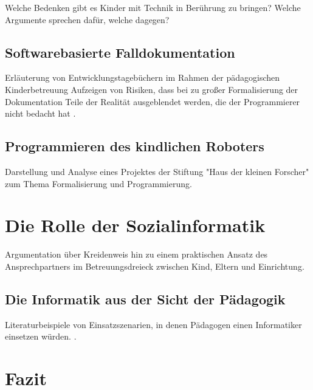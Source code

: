 Welche Bedenken gibt es Kinder mit Technik in Berührung zu bringen? Welche Argumente sprechen dafür, welche 
dagegen?

\section{Softwarebasierte Falldokumentation}

Erläuterung von Entwicklungstagebüchern im Rahmen der pädagogischen Kinderbetreuung 
Aufzeigen von Risiken, dass bei zu großer Formalisierung der Dokumentation Teile der Realität ausgeblendet werden, die der Programmierer nicht bedacht hat \citep[vgl.][38 ff]{weber2017}. 

\section{Programmieren des kindlichen Roboters}

Darstellung und Analyse eines Projektes der Stiftung "Haus der kleinen Forscher" zum Thema Formalisierung und Programmierung\citep[vgl.][]{roboter}.

\chapter{Die Rolle der Sozialinformatik}

Argumentation über Kreidenweis hin zu einem praktischen Ansatz des Ansprechpartners im Betreuungsdreieck zwischen Kind, Eltern und Einrichtung.

\section{Die Informatik aus der Sicht der Pädagogik}

Literaturbeispiele von Einsatzszenarien, in denen Pädagogen einen Informatiker einsetzen würden. \citep[][41]{Klar2015}. 

\chapter{Fazit}

\blindtext
